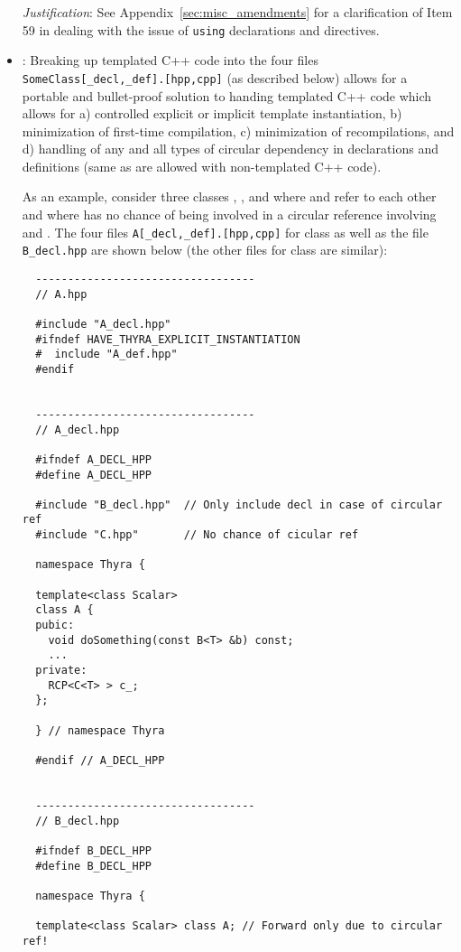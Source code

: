 \begin{itemize}
{}\textit{Justification}: See Appendix~\ref{sec:misc_amendments} for a
clarification of Item 59 in {}\cite{C++CodingStandards05} dealing with the
issue of {}\texttt{using} declarations and directives.


{}\item\GCGTemplateHeaders\label{gcg:template-instantation-files}:
Breaking up templated C++ code into the four files
{}\texttt{SomeClass[\_decl,\_def].[hpp,cpp]} (as described below)
allows for a portable and bullet-proof solution to handing templated
C++ code which allows for a) controlled explicit or implicit template
instantiation, b) minimization of first-time compilation, c)
minimization of recompilations, and d) handling of any and all types
of circular dependency in declarations and definitions (same as are
allowed with non-templated C++ code).

As an example, consider three classes {}, {}, and {}
where {} and {} refer to each other and where {} has no
chance of being involved in a circular reference involving {} and
{}.  The four files {}\texttt{A[\_decl,\_def].[hpp,cpp]} for class
{} as well as the file {}\texttt{B\_decl.hpp} are shown below (the
other files for class {} are similar):


{\small\begin{verbatim}
  ----------------------------------
  // A.hpp

  #include "A_decl.hpp"
  #ifndef HAVE_THYRA_EXPLICIT_INSTANTIATION
  #  include "A_def.hpp"
  #endif


  ----------------------------------
  // A_decl.hpp

  #ifndef A_DECL_HPP
  #define A_DECL_HPP

  #include "B_decl.hpp"  // Only include decl in case of circular ref
  #include "C.hpp"       // No chance of cicular ref

  namespace Thyra {

  template<class Scalar>
  class A {
  pubic:
    void doSomething(const B<T> &b) const;
    ...
  private:
    RCP<C<T> > c_;
  };

  } // namespace Thyra

  #endif // A_DECL_HPP


  ----------------------------------
  // B_decl.hpp

  #ifndef B_DECL_HPP
  #define B_DECL_HPP

  namespace Thyra {

  template<class Scalar> class A; // Forward only due to circular ref!


\end{verbatim}}
\end{itemize}

